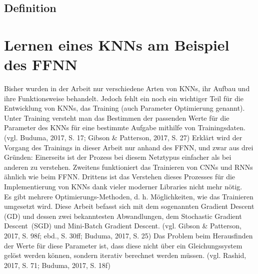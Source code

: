 \documentclass[a4paper,12pt,ngerman,oneside]{scrreprt}	%
\begin{document}
		\section{Definition}
	
	
	
	\chapter{Lernen eines KNNs am Beispiel des FFNN}\label{Lernen}
	Bisher wurden in der Arbeit nur verschiedene Arten von KNNs, ihr Aufbau und ihre Funktionsweise behandelt. Jedoch fehlt ein noch ein wichtiger Teil für die Entwicklung von KNNs, das Training (auch Parameter Optimierung genannt). Unter Training versteht man das Bestimmen der passenden Werte für die Parameter des KNNs für eine bestimmte Aufgabe mithilfe von Trainingsdaten. (vgl. Buduma, 2017, S. 17; Gibson \& Patterson, 2017, S. 27) Erklärt wird der Vorgang des Trainings in dieser Arbeit nur anhand des FFNN, und zwar aus drei Gründen: Einerseits ist der Prozess bei diesem Netztypus einfacher als bei anderen zu verstehen. Zweitens funktioniert das Trainieren von CNNs und RNNs ähnlich wie beim FFNN. Drittens ist das Verstehen dieses Prozesses für die Implementierung von KNNs dank vieler moderner Libraries nicht mehr nötig. \\
	
	Es gibt mehrere Optimierungs-Methoden, d. h. Möglichkeiten, wie das Trainieren umgesetzt wird. Diese Arbeit befasst sich mit dem sogenannten Gradient Descent (GD) und dessen zwei bekanntesten Abwandlungen, dem Stochastic Gradient \mbox{Descent (SGD)} und Mini-Batch Gradient Descent. (vgl. Gibson \& Patterson, 2017, S. 98f; ebd., S. 30ff; Buduma, 2017, S. 25) Das Problem beim Herausfinden der Werte für diese Parameter ist, dass diese nicht über ein Gleichungssystem gelöst werden können, sondern iterativ berechnet werden müssen. (vgl. Rashid, 2017, S. 71; Buduma, 2017, S. 18f)
	
\end{document}
